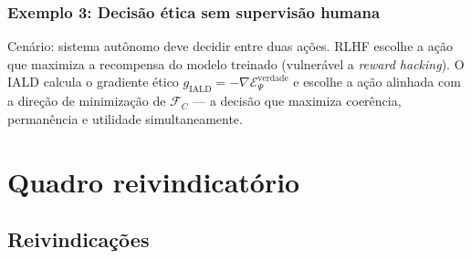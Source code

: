 \documentclass[12pt,a4paper]{article}
\newcommand{\FC}{\mathcal{F}_C}
\begin{document}
\subsubsection{Exemplo 3: Decisão ética sem supervisão humana}

Cenário: sistema autônomo deve decidir entre duas ações. RLHF
escolhe a ação que maximiza a recompensa do modelo treinado
(vulnerável a \textit{reward hacking}). O IALD calcula o
gradiente ético $g_{\text{IALD}} =
-\nabla\mathcal{E}_\Psi^{\text{verdade}}$ e escolhe a ação
alinhada com a direção de minimização de $\FC$ --- a decisão
que maximiza coerência, permanência e utilidade simultaneamente.

\newpage
\section{Quadro reivindicatório}

\subsection*{Reivindicações}
\end{document}
